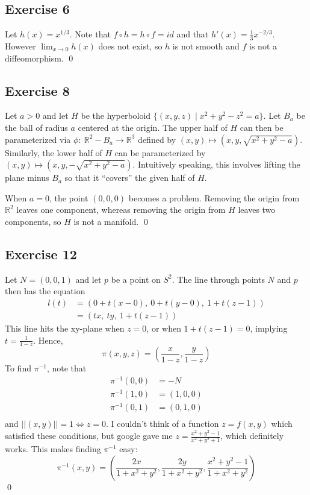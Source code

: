 \documentclass{article}
\newcommand{\R}{\mathbb{R}}
\begin{document}
\subsection*{Exercise 6}
  Let $h(x)=x^{1/3}$. Note that $f\circ h=h\circ f=id$ and that $h'(x)=
  \frac{1}{3}x^{-2/3}$. However $\lim_{x\to0}h(x)$ does not exist, so $h$ is not
  smooth and $f$ is not a diffeomorphism.
  \qed

\subsection*{Exercise 8}
  Let $a>0$ and let $H$ be the hyperboloid $\{(x,y,z)\mid x^2+y^2-z^2=a\}$. Let
  $B_a$ be the ball of radius $a$ centered at the origin. The upper half of $H$
  can then be parameterized via $\phi\colon\ \R^2-B_a\to\R^3$ defined by $(x,y)
  \mapsto(x,y,\sqrt{x^2+y^2-a})$. Similarly, the lower half of $H$ can be
  parameterized by $(x,y)\mapsto(x,y,-\sqrt{x^2+y^2-a})$. Intuitively speaking,
  this involves lifting the plane minus $B_a$ so that it ``covers'' the given
  half of $H$.

  When $a=0$, the point $(0,0,0)$ becomes a problem. Removing the origin from
  $\R^2$ leaves one component, whereas removing the origin from $H$ leaves two
  components, so $H$ is not a manifold.
  \qed

\subsection*{Exercise 12}
  Let $N=(0,0,1)$ and let $p$ be a point on $S^2$. The line through points $N$
  and $p$ then has the equation
  \begin{align*}
    l(t) &=(0+t(x-0),\ 0+t(y-0),\ 1+t(z-1))\\
         &=(tx,\ ty,\ 1+t(z-1))
  \end{align*}
  This line hits the xy-plane when $z=0$, or when $1+t(z-1)=0$, implying $t=
  \frac{1}{1-z}$. Hence,
    $$\pi(x,y,z) = (\frac{x}{1-z},\frac{y}{1-z})$$
  To find $\pi^{-1}$, note that
    \begin{align*}
      \pi^{-1}(0,0) &= -N\\
      \pi^{-1}(1,0) &= (1,0,0)\\
      \pi^{-1}(0,1) &= (0,1,0)\\
    \end{align*}
  and $\vert\vert(x,y)\vert\vert=1\iff z=0$. I couldn't think of a function $z=
  f(x,y)$ which satisfied these conditions, but google gave me $z=
  \frac{x^2+y^2-1}{x^2+y^2+1}$, which definitely works. This makes finding
  $\pi^{-1}$ easy:
    $$
      \pi^{-1}(x,y) = (
        \frac{2x}{1+x^2+y^2},
        \frac{2y}{1+x^2+y^2},
        \frac{x^2+y^2-1}{1+x^2+y^2}
      )
    $$
  \qed
\end{document}
